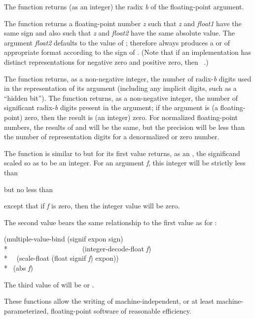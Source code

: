 \begin{defun}[Function]
The function  returns (as an integer)
the radix \emph{b} of the floating-point argument.

The function  returns a floating-point number \emph{z} such
that \emph{z} and \emph{float1} have the same sign and also such that
\emph{z} and \emph{float2} have the same absolute value.
The argument \emph{float2} defaults to the value of ;
 therefore always produces a  or 
of appropriate format
according to the sign of .  (Note that if an implementation
has distinct representations for negative zero and positive zero,
then  \EV\ .)

The function  returns, as a non-negative integer,
the number of radix-\emph{b} digits
used in the representation of its argument (including any implicit
digits, such as a ``hidden bit'').
The function 
returns, as a non-negative integer,
the number of significant radix-\emph{b} digits present in the
argument; if the argument is (a floating-point)
zero, then the result is (an integer) zero.
For normalized floating-point numbers, the results of 
and 
will be the same, but the precision will be less than the
number of representation digits for a denormalized or zero number.

The function  is similar to 
but for its first value returns,
as an , the significand scaled so as to be an integer.
For an argument \emph{f}, this integer will be strictly less than
\begin{lisp}
\end{lisp}
but no less than
\begin{lisp}
\end{lisp}
except that if \emph{f} is zero, then the integer value will be zero.

The second value bears the same relationship to the first value
as for :
\begin{lisp}
(multiple-value-bind (signif expon sign) \\*
~~~~~~~~~~~~~~~~~~~~~(integer-decode-float \emph{f}) \\*
~~(scale-float (float signif \emph{f}) expon)) \\*
\EQ\ (abs \emph{f})
\end{lisp}

The third value of  will be  or .

\beforenoterule
\begin{rationale}
These functions allow the writing of machine-independent,
or at least machine-parameterized, floating-point software of reasonable
efficiency.
\end{rationale}
\afternoterule
\end{defun}

